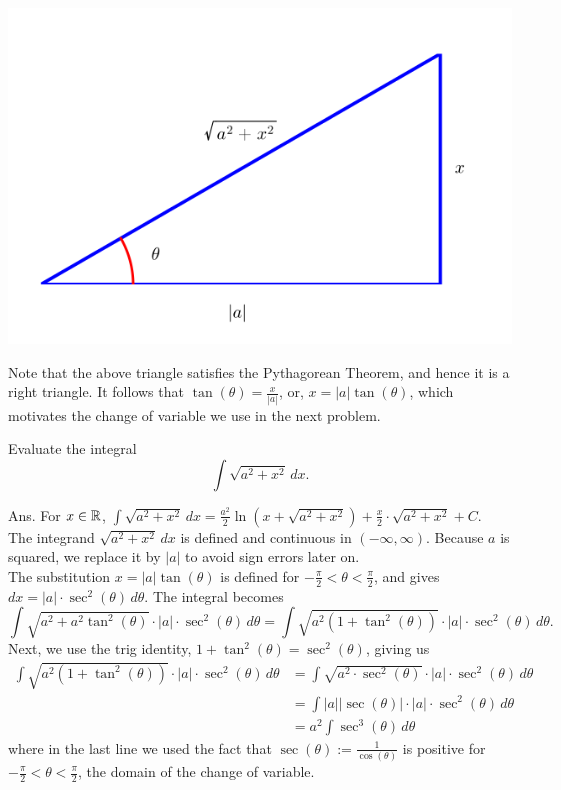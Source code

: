 
\begin{center}
    \includegraphics[width=0.6\columnwidth]{graphics/Chap07/TrigSubSqRtAsqPlusXsq.png}
\end{center}

Note that the above triangle satisfies the Pythagorean Theorem, and hence it is a right triangle. It follows that $\tan(\theta) =  \frac{x}{|a|}$, or, $x = |a| \tan(\theta)$, which motivates the change of variable we use in the next problem. \\


\begin{example} Evaluate the integral
\[
\int \sqrt{a^2 + x^2} \, dx.
\]    
\end{example}

\solution Ans. For $x \in \mathbb R$, $\int \sqrt{a^2 + x^2} \, dx =  \frac{a^2}{2}\ln \left(x +  \sqrt{a^2 + x^2 } \right) +   \frac{x}{2} \cdot \sqrt{a^2 + x^2} +C$.\\

The integrand $\sqrt{a^2 + x^2} \, dx$ is defined and continuous in $(-\infty, \infty)$. Because $a$ is squared, we replace it by $|a|$ to avoid sign errors later on.\\

The substitution \( x = |a| \tan(\theta) \)  is defined for $ -\frac{\pi}{2} < \theta < \frac{\pi}{2}$, and gives  \( dx = |a| \cdot \sec^2(\theta) \, d\theta \). The integral becomes
\[
\int \sqrt{a^2 + a^2 \tan^2(\theta)} \cdot  |a| \cdot \sec^2(\theta) \, d\theta =  \int \sqrt{a^2 \left(1 + \tan^2(\theta) \right)}\cdot  |a| \cdot \sec^2(\theta) \, d\theta.
\]
Next, we use the trig identity,  $1 + \tan^2(\theta) = \sec^2(\theta)$, giving us 
\begin{align*}
    \int \sqrt{a^2 \left(1 + \tan^2(\theta) \right)}\cdot  |a| \cdot \sec^2(\theta) \, d\theta & = \int \sqrt{a^2 \cdot \sec^2(\theta)} \cdot  |a| \cdot \sec^2(\theta) \, d\theta \\[1em] 
    &= \int |a| |\sec(\theta)| \cdot  |a| \cdot \sec^2(\theta) \, d\theta \\[1em]
    & = a^2  \int \sec^3(\theta) \, d\theta
\end{align*}
where in the last line we used the fact that $\sec(\theta):=\frac{1}{\cos(\theta)}$ is positive for $ -\frac{\pi}{2} < \theta < \frac{\pi}{2}$, the domain of the change of variable.\\


